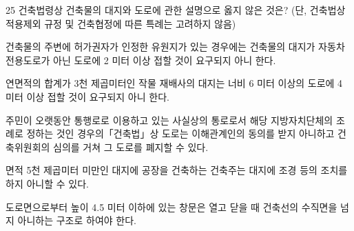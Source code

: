 \begin{question}{25}
건축법령상 건축물의 대지와 도로에 관한 설명으로 옳지 않은 것은? (단, 건축법상 적용제외 규정 및 건축협정에 따른 특례는 고려하지 않음)
\begin{choices}
  \item 건축물의 주변에 허가권자가 인정한 유원지가 있는 경우에는 건축물의 대지가 자동차전용도로가 아닌 도로에 2 미터 이상 접할 것이 요구되지 아니 한다.
  \item 연면적의 합계가 3천 제곱미터인 작물 재배사의 대지는 너비 6 미터 이상의 도로에 4 미터 이상 접할 것이 요구되지 아니 한다.
  \item 주민이 오랫동안 통행로로 이용하고 있는 사실상의 통로로서 해당 지방자치단체의 조례로 정하는 것인 경우의「건축법」상 도로는 이해관계인의 동의를 받지 아니하고 건축위원회의 심의를 거쳐 그 도로를 폐지할 수 있다.
  \item 면적 5천 제곱미터 미만인 대지에 공장을 건축하는 건축주는 대지에 조경 등의 조치를 하지 아니할 수 있다.
  \item 도로면으로부터 높이 4.5 미터 이하에 있는 창문은 열고 닫을 때 건축선의 수직면을 넘지 아니하는 구조로 하여야 한다.
\end{choices}
\end{question}
